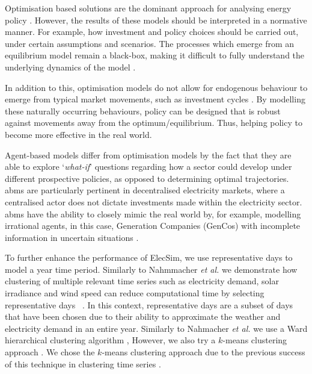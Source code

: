 
Optimisation based solutions are the dominant approach for analysing energy policy \cite{Chappin2017}. However, the results of these models should be interpreted in a normative manner. For example, how investment and policy choices should be carried out, under certain assumptions and scenarios. The processes which emerge from an equilibrium model remain a black-box, making it difficult to fully understand the underlying dynamics of the model \cite{Chappin2017}. 



In addition to this, optimisation models do not allow for endogenous behaviour to emerge from typical market movements, such as investment cycles \cite{Chappin2017, Gross2007}. By modelling these naturally occurring behaviours, policy can be designed that is robust against movements away from the optimum/equilibrium. Thus, helping policy to become more effective in the real world. 

Agent-based models differ from optimisation models by the fact that they are able to explore `\textit{what-if}' questions regarding how a sector could develop under different prospective policies, as opposed to determining optimal trajectories. \acrshort{abm}s are particularly pertinent in decentralised electricity markets, where a centralised actor does not dictate investments made within the electricity sector. \acrshort{abm}s have the ability to closely mimic the real world by, for example, modelling irrational agents, in this case, Generation Companies (GenCos) with incomplete information in uncertain situations \cite{Ghorbani2014}. 


To further enhance the performance of ElecSim, we use representative days to model a year time period. Similarly to Nahmmacher \textit{et al.} we demonstrate how clustering of multiple relevant time series such as electricity demand, solar irradiance and wind speed can reduce computational time by selecting representative days ~\cite{Nahmmacher2016}. In this context, representative days are a subset of days that have been chosen due to their ability to approximate the weather and electricity demand in an entire year. Similarly to Nahmacher \textit{et al.} we use a Ward hierarchical clustering algorithm  \cite{doi:10.1080/01621459.1963.10500845}, However, we also try a $k$-means clustering approach \cite{forgy65}. We chose the $k$-means clustering approach due to the previous success of this technique in clustering time series \cite{Kell2018a}. 



